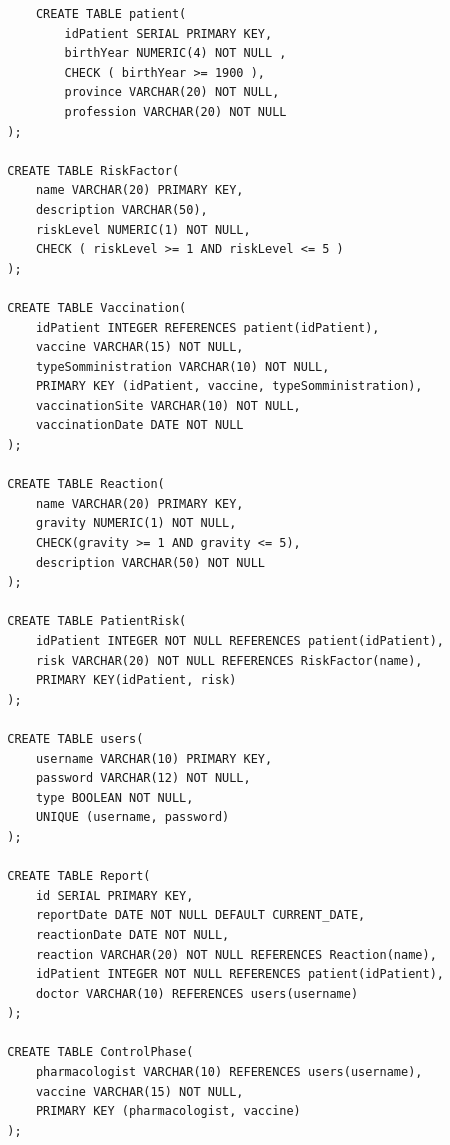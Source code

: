 \documentclass{article}
\begin{document}
        \begin{verbatim}
            CREATE TABLE patient(
                idPatient SERIAL PRIMARY KEY,
                birthYear NUMERIC(4) NOT NULL ,
                CHECK ( birthYear >= 1900 ),
                province VARCHAR(20) NOT NULL,
                profession VARCHAR(20) NOT NULL
        );
        
        CREATE TABLE RiskFactor(
            name VARCHAR(20) PRIMARY KEY,
            description VARCHAR(50),
            riskLevel NUMERIC(1) NOT NULL,
            CHECK ( riskLevel >= 1 AND riskLevel <= 5 )
        );
        
        CREATE TABLE Vaccination(
            idPatient INTEGER REFERENCES patient(idPatient),
            vaccine VARCHAR(15) NOT NULL,
            typeSomministration VARCHAR(10) NOT NULL,
            PRIMARY KEY (idPatient, vaccine, typeSomministration),
            vaccinationSite VARCHAR(10) NOT NULL,
            vaccinationDate DATE NOT NULL
        );
        
        CREATE TABLE Reaction(
            name VARCHAR(20) PRIMARY KEY,
            gravity NUMERIC(1) NOT NULL,
            CHECK(gravity >= 1 AND gravity <= 5),
            description VARCHAR(50) NOT NULL
        );
        
        CREATE TABLE PatientRisk(
            idPatient INTEGER NOT NULL REFERENCES patient(idPatient),
            risk VARCHAR(20) NOT NULL REFERENCES RiskFactor(name),
            PRIMARY KEY(idPatient, risk)
        );
        
        CREATE TABLE users(
            username VARCHAR(10) PRIMARY KEY,
            password VARCHAR(12) NOT NULL,
            type BOOLEAN NOT NULL,
            UNIQUE (username, password)
        );
        
        CREATE TABLE Report(
            id SERIAL PRIMARY KEY,
            reportDate DATE NOT NULL DEFAULT CURRENT_DATE,
            reactionDate DATE NOT NULL,
            reaction VARCHAR(20) NOT NULL REFERENCES Reaction(name),
            idPatient INTEGER NOT NULL REFERENCES patient(idPatient),
            doctor VARCHAR(10) REFERENCES users(username)
        );
        
        CREATE TABLE ControlPhase(
            pharmacologist VARCHAR(10) REFERENCES users(username),
            vaccine VARCHAR(15) NOT NULL,
            PRIMARY KEY (pharmacologist, vaccine)
        );
        \end{verbatim}
\end{document}
